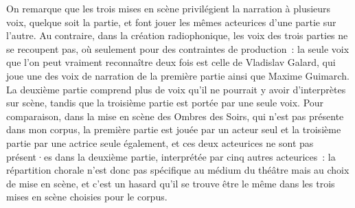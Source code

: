 \documentclass[
]{article}
\begin{document}
On remarque que les trois mises en scène privilégient la narration à plusieurs voix, quelque soit la partie, et font jouer les mêmes acteurices d'une partie sur l'autre. Au contraire, dans la création radiophonique, les voix des trois parties ne se recoupent pas, où seulement pour des contraintes de production~: la seule voix que l'on peut vraiment reconnaître deux fois est celle de Vladislav Galard, qui joue une des voix de narration de la première partie ainsi que Maxime Guimarch. La deuxième partie comprend plus de voix qu'il ne pourrait y avoir d'interprètes sur scène, tandis que la troisième partie est portée par une seule voix. Pour comparaison, dans la mise en scène des Ombres des Soirs, qui n'est pas présente dans mon corpus, la première partie est jouée par un acteur seul et la troisième partie par une actrice seule également, et ces deux acteurices ne sont pas présent·es dans la deuxième partie, interprétée par cinq autres acteurices~: la répartition chorale n'est donc pas spécifique au médium du théâtre mais au choix de mise en scène, et c'est un hasard qu'il se trouve être le même dans les trois mises en scène choisies pour le corpus.
\end{document}
